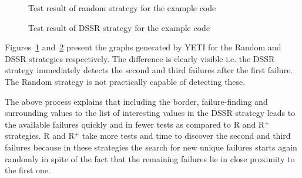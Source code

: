 \bigskip
\begin{figure}[H]
\centering
\setlength{\fboxsep}{0pt}%
\setlength{\fboxrule}{1pt}%
\bigskip
\caption{Test result of random strategy for the example code}
\label{fig:random_result}
\end{figure}

\bigskip

\begin{figure}[H]
\centering
\setlength{\fboxsep}{0pt}%
\setlength{\fboxrule}{1pt}%
\bigskip
\caption{Test result of DSSR strategy for the example code}
\label{fig:dssr_result}
\end{figure}
\bigskip

Figures~\ref{fig:random_result} and~\ref{fig:dssr_result} present the graphs generated by YETI for the Random and DSSR strategies respectively. The difference is clearly visible i.e. the DSSR strategy immediately detects the second and third failures after the first failure. The Random strategy is not practically capable of detecting these. 

The above process explains that including the border, failure-finding and surrounding values to the list of interesting values in the DSSR strategy leads to the available failures quickly and in fewer tests as compared to R and R$^+$ strategies. R and R$^+$ take more tests and time to discover the second and third failures because in these strategies the search for new unique failures starts again randomly in spite of the fact that the remaining failures lie in close proximity to the first one.





